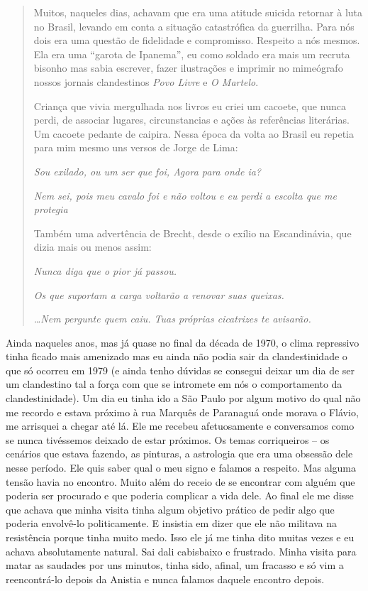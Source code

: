 \begin{quote}
Muitos, naqueles dias, achavam que era uma atitude suicida retornar à
luta no Brasil, levando em conta a situação catastrófica da guerrilha.
Para nós dois era uma questão de fidelidade e compromisso. Respeito a
nós mesmos. Ela era uma “garota de Ipanema”, eu como soldado era mais um
recruta bisonho mas sabia escrever, fazer ilustrações e imprimir no
mimeógrafo nossos jornais clandestinos \textit{Povo Livre} e \textit{O
Martelo}.

Criança que vivia mergulhada nos livros eu criei um cacoete, que nunca
perdi, de associar lugares, circunstancias e ações às referências
literárias. Um cacoete pedante de caipira. Nessa época da volta ao
Brasil eu repetia para mim mesmo uns versos de Jorge de Lima:

\textit{Sou exilado, ou um ser que foi, Agora para onde ia?}

\textit{Nem sei, pois meu cavalo foi e não voltou e eu perdi a escolta que
me protegia}

Também uma advertência de Brecht, desde o exílio na Escandinávia, que
dizia mais ou menos assim:

\textit{Nunca diga que o pior já passou.}

\textit{Os que suportam a carga voltarão a renovar suas queixas.}

\textit{\ldots{}Nem pergunte quem caiu. Tuas próprias cicatrizes te
avisarão.}
\end{quote}

Ainda naqueles anos, mas já quase no final da década de 1970, o clima
repressivo tinha ficado mais amenizado mas eu ainda não podia sair da
clandestinidade o que só ocorreu em 1979 (e ainda tenho dúvidas se
consegui deixar um dia de ser um clandestino tal a força com que se
intromete em nós o comportamento da clandestinidade). Um dia eu tinha
ido a São Paulo por algum motivo do qual não me recordo e estava próximo
à rua Marquês de Paranaguá onde morava o Flávio, me arrisquei a chegar
até lá. Ele me recebeu afetuosamente e conversamos como se nunca
tivéssemos deixado de estar próximos. Os temas corriqueiros -- os
cenários que estava fazendo, as pinturas, a astrologia que era uma
obsessão dele nesse período. Ele quis saber qual o meu signo e falamos a
respeito. Mas alguma tensão havia no encontro. Muito além do receio de
se encontrar com alguém que poderia ser procurado e que poderia
complicar a vida dele. Ao final ele me disse que achava que minha visita
tinha algum objetivo prático de pedir algo que poderia envolvê-lo
politicamente. E insistia em dizer que ele não militava na resistência
porque tinha muito medo. Isso ele já me tinha dito muitas vezes e eu
achava absolutamente natural. Sai dali cabisbaixo e frustrado. Minha
visita para matar as saudades por uns minutos, tinha sido, afinal, um
fracasso e só vim a reencontrá-lo depois da Anistia e nunca falamos
daquele encontro depois.


